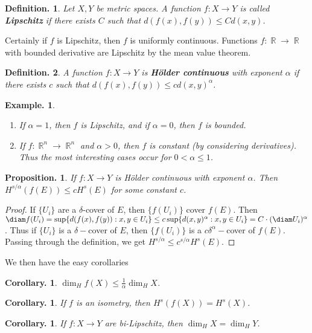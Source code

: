 \documentclass[11pt, a4paper]{memoir}
\DeclareMathOperator{\R}{{\mathbb{R}}}
\theoremstyle{change}
\newtheorem{corollary}[theorem]{Corollary.}
\newtheorem{proposition}[theorem]{Proposition.}
\theoremstyle{plain}
\theoremstyle{nonumberplain}
\newtheorem{definition}{Definition.}
\newtheorem{example}{Example.}
\newtheorem{proof}{Proof}
\newcommand{\defn}[1]{{\boldmath\bfseries #1}}
\numberwithin{equation}{section}
\begin{document}
\begin{definition}
    Let $X,Y$ be metric spaces.
    A function $f:X\to Y$ is called \defn{Lipschitz} if there exists $C$ such that $d(f(x),f(y))\leq Cd(x,y)$.
\end{definition}
Certainly if $f$ is Lipschitz, then $f$ is uniformly continuous.
Functions $f:\R\to\R$ with bounded derivative are Lipschitz by the mean value theorem.
\begin{definition}
    A function $f:X\to Y$ is \defn{Hölder continuous} with exponent $\alpha$ if there exists $c$ such that $d(f(x),f(y))\leq c d(x,y)^\alpha$.
\end{definition}
\begin{example}
    \begin{enumerate}[nl,r]
        \item If $\alpha=1$, then $f$ is Lipschitz, and if $\alpha=0$, then $f$ is bounded.
        \item If $f:\R^n\to\R^n$ and $\alpha>0$, then $f$ is constant (by considering derivatives).
            Thus the most interesting cases occur for $0<\alpha\leq 1$.
    \end{enumerate}
\end{example}
\begin{proposition}
    If $f:X\to Y$ is Hölder continuous with exponent $\alpha$.
    Then $H^{s/\alpha}(f(E))\leq cH^s(E)$ for some constant $c$.
\end{proposition}
\begin{proof}
    If $\{U_i\}$ are a $\delta$-cover of $E$, then $\{f(U_i)\}$ cover $f(E)$.
    Then $\diam f(U_i)=\sup\{d(f(x),f(y)):x,y\in U_i\}\leq c\sup\{d(x,y)^\alpha:x,y\in U_i\}=C\cdot(\diam U_i)^\alpha$.
    Thus if $\{U_i\}$ is a $\delta-$cover of $E$, then $\{f(U_i)\}$ is a $c\delta^\alpha-$cover of $f(E)$.
    Passing through the definition, we get $H^{s/\alpha}\leq c^{s/\alpha}H^s(E)$.
\end{proof}
We then have the easy corollaries
\begin{corollary}
    $\dim_H f(X)\leq\frac{1}{\alpha}\dim_H X$.
\end{corollary}
\begin{corollary}
    If $f$ is an isometry, then $H^s(f(X))=H^s(X)$.
\end{corollary}
\begin{corollary}
    If $f:X\to Y$ are bi-Lipschitz, then $\dim_H X=\dim_H Y$.
\end{corollary}
\end{document}
